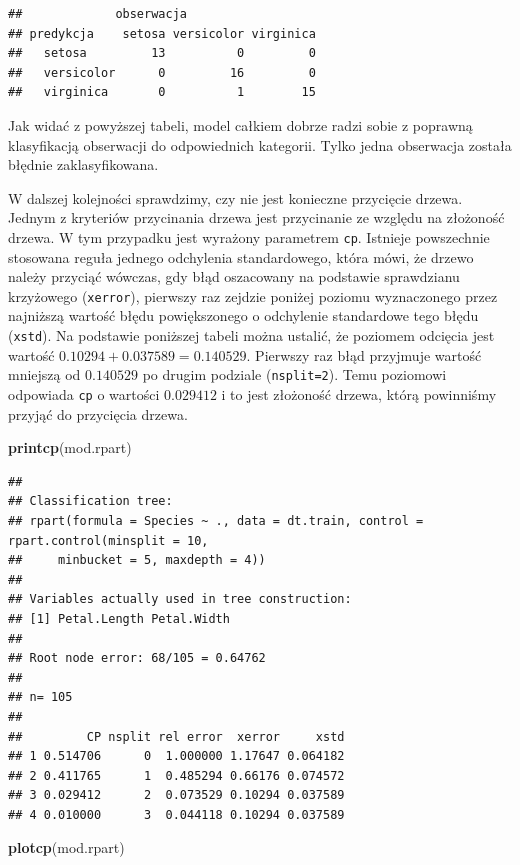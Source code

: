 \documentclass[]{book}
\newenvironment{Shaded}{\begin{snugshade}}{\end{snugshade}}
\newcommand{\KeywordTok}[1]{\textcolor[rgb]{0.13,0.29,0.53}{\textbf{#1}}}
\newcommand{\NormalTok}[1]{#1}
\theoremstyle{plain}
\theoremstyle{definition}
\theoremstyle{definition}
\theoremstyle{definition}
\theoremstyle{definition}
\theoremstyle{remark}
\begin{document}
\begin{verbatim}
##             obserwacja
## predykcja    setosa versicolor virginica
##   setosa         13          0         0
##   versicolor      0         16         0
##   virginica       0          1        15
\end{verbatim}

Jak widać z powyższej tabeli, model całkiem dobrze radzi sobie z poprawną klasyfikacją obserwacji do odpowiednich kategorii. Tylko jedna obserwacja została błędnie zaklasyfikowana.

W dalszej kolejności sprawdzimy, czy nie jest konieczne przycięcie drzewa. Jednym z kryteriów przycinania drzewa jest przycinanie ze względu na złożoność drzewa. W tym przypadku jest wyrażony parametrem \texttt{cp}. Istnieje powszechnie stosowana reguła jednego odchylenia standardowego, która mówi, że drzewo należy przyciąć wówczas, gdy błąd oszacowany na podstawie sprawdzianu krzyżowego (\texttt{xerror}), pierwszy raz zejdzie poniżej poziomu wyznaczonego przez najniższą wartość błędu powiększonego o odchylenie standardowe tego błędu (\texttt{xstd}). Na podstawie poniższej tabeli można ustalić, że poziomem odcięcia jest wartość \(0.10294+0.037589=0.140529\). Pierwszy raz błąd przyjmuje wartość mniejszą od \(0.140529\) po drugim podziale (\texttt{nsplit=2}). Temu poziomowi odpowiada \texttt{cp} o wartości \(0.029412\) i to jest złożoność drzewa, którą powinniśmy przyjąć do przycięcia drzewa.

\begin{Shaded}
\begin{Highlighting}[]
\KeywordTok{printcp}\NormalTok{(mod.rpart)}
\end{Highlighting}
\end{Shaded}

\begin{verbatim}
## 
## Classification tree:
## rpart(formula = Species ~ ., data = dt.train, control = rpart.control(minsplit = 10, 
##     minbucket = 5, maxdepth = 4))
## 
## Variables actually used in tree construction:
## [1] Petal.Length Petal.Width 
## 
## Root node error: 68/105 = 0.64762
## 
## n= 105 
## 
##         CP nsplit rel error  xerror     xstd
## 1 0.514706      0  1.000000 1.17647 0.064182
## 2 0.411765      1  0.485294 0.66176 0.074572
## 3 0.029412      2  0.073529 0.10294 0.037589
## 4 0.010000      3  0.044118 0.10294 0.037589
\end{verbatim}

\begin{Shaded}
\begin{Highlighting}[]
\KeywordTok{plotcp}\NormalTok{(mod.rpart)}
\end{Highlighting}
\end{Shaded}
\end{document}

